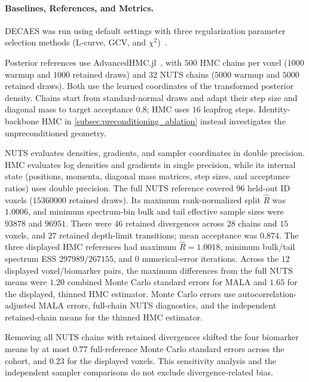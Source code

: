 \paragraph*{Baselines, References, and Metrics.}
\gls*{DECAES} was run using default settings with three regularization parameter selection methods (L-curve, \gls*{GCV}, and $\chi^2$)~\citep{doucette_decaes_2020}.

Posterior references use AdvancedHMC.jl~\citep{xu_advancedhmc_2020}, with $500$ \gls*{HMC} chains per voxel ($\num{1000}$ warmup and $\num{1000}$ retained draws) and $32$ \gls*{NUTS} chains ($\num{5000}$ warmup and $\num{5000}$ retained draws).
Both use the learned coordinates of the transformed posterior density.
Chains start from standard-normal draws and adapt their step size and diagonal mass to target acceptance $0.8$;
\gls*{HMC} uses $16$ leapfrog steps.
Identity-backbone \gls*{HMC} in \cref{subsec:preconditioning_ablation} instead investigates the unpreconditioned geometry.

\gls*{NUTS} evaluates densities, gradients, and sampler coordinates in double precision.
\gls*{HMC} evaluates log densities and gradients in single precision, while its internal state (positions, momenta, diagonal mass matrices, step sizes, and acceptance ratios) uses double precision.
The full \gls*{NUTS} reference covered $96$ held-out ID voxels ($\num{15360000}$ retained draws).
Its maximum rank-normalized split $\hat{R}$ was $1.0006$, and minimum spectrum-bin bulk and tail effective sample sizes were $\num{93878}$ and $\num{96951}$.
There were $46$ retained divergences across $28$ chains and $15$ voxels, and $27$ retained depth-limit transitions;
mean acceptance was $0.874$.
The three displayed \gls*{HMC} references had maximum $\hat{R}=1.0018$, minimum bulk/tail spectrum ESS $\num{297989}/\num{267155}$, and $0$ numerical-error iterations.
Across the $12$ displayed voxel/biomarker pairs, the maximum differences from the full \gls*{NUTS} means were $1.20$ combined Monte Carlo standard errors for \gls*{MALA} and $1.65$ for the displayed, thinned \gls*{HMC} estimator.
Monte Carlo errors use autocorrelation-adjusted \gls*{MALA} errors, full-chain \gls*{NUTS} diagnostics, and the independent retained-chain means for the thinned \gls*{HMC} estimator.

Removing all \gls*{NUTS} chains with retained divergences shifted the four biomarker means by at most $0.77$ full-reference Monte Carlo standard errors across the cohort, and $0.23$ for the displayed voxels.
This sensitivity analysis and the independent sampler comparisons do not exclude divergence-related bias.

